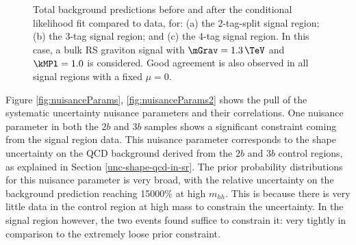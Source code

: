 \begin{figure*}[htbp!]
\begin{center}
  \caption{Total background predictions before and after the conditional likelihood fit compared to data, for: (a) the 2-tag-split signal region; (b) the 3-tag signal region; and (c) the 4-tag signal region. In this case, a bulk RS graviton signal with $\mGrav=1.3\,\TeV$ and $\kMPl=1.0$ is considered. Good agreement is also observed in all signal regions with a fixed $\mu=0$.}
  \label{fig:postFitSRs}
\end{center}
\end{figure*}

Figure \ref{fig:nuisanceParams}, \ref{fig:nuisanceParams2} shows the pull of the systematic uncertainty nuisance parameters and their correlations. One nuisance parameter in both the $2b$ and $3b$ samples shows a significant constraint coming from the signal region data. This nuisance parameter corresponds to the shape uncertainty on the QCD background derived from the $2b$ and $3b$ control regions, as explained in Section \ref{unc-shape-qcd-in-sr}. The prior probability distributions for this nuisance parameter is very broad, with the relative uncertainty on the background prediction reaching 15000\% at high $m_{hh}$. This is because there is very little data in the control region at high mass to constrain the uncertainty. In the signal region however, the two events found suffice to constrain it: very tightly in comparison to the extremely loose prior constraint.

